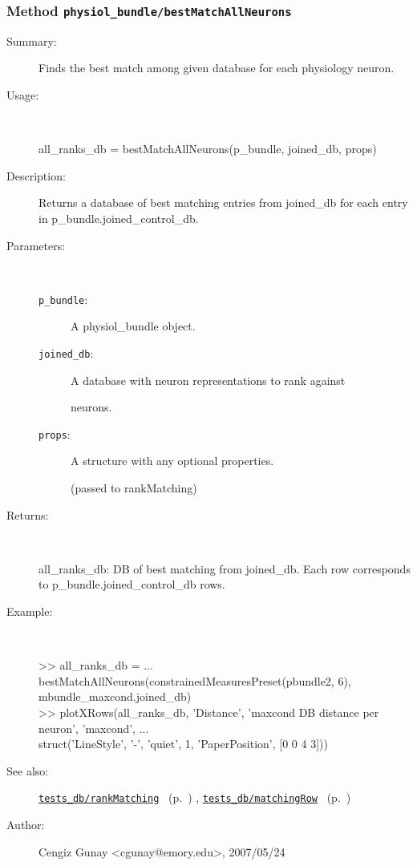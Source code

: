 \subsubsection[Method \texttt{bestMatchAllNeurons}]{Method \texttt{physiol\_bundle/bestMatchAllNeurons}}%
%
\label{ref_physiol_bundle__bestMatchAllNeurons}%
\hypertarget{ref_physiol_bundle__bestMatchAllNeurons}{}%
\begin{description}
\item[Summary:]Finds the best match among given database for each physiology neuron.
%
\item[Usage:]~%
\begin{lyxcode}%
all\_ranks\_db = bestMatchAllNeurons(p\_bundle, joined\_db, props)
%
\end{lyxcode}%
%
\item[Description:]%
Returns a database of best matching entries from joined\_db for each
 entry in p\_bundle.joined\_control\_db.
\item[Parameters:]~
\begin{description}%
\item[\texttt{p\_bundle}:]
 A physiol\_bundle object.
\item[\texttt{joined\_db}:]
 A database with neuron representations to rank against

neurons.
\item[\texttt{props}:]
 A structure with any optional properties.

(passed to rankMatching)
\end{description}%
%
\item[Returns:
]~

	all\_ranks\_db: DB of best matching from joined\_db. Each row
		corresponds to p\_bundle.joined\_control\_db rows.
%
\item[Example:]~
\begin{lyxcode} >> all\_ranks\_db = ...
\\%
        bestMatchAllNeurons(constrainedMeasuresPreset(pbundle2, 6), mbundle\_maxcond.joined\_db)
\\%
 >> plotXRows(all\_ranks\_db, 'Distance', 'maxcond DB distance per neuron', 'maxcond', ...
\\%
              struct('LineStyle', '-', 'quiet', 1, 'PaperPosition', [0 0 4 3]))
\\%
\end{lyxcode}
%
\item[See also:]%
\hyperlink{ref_tests_db__rankMatching}{\texttt{tests\_db/rankMatching}}%
\ (p.~\pageref{ref_tests_db__rankMatching})%
%
, \hyperlink{ref_tests_db__matchingRow}{\texttt{tests\_db/matchingRow}}%
\ (p.~\pageref{ref_tests_db__matchingRow})%
%
%
\item[Author:]%
Cengiz Gunay <cgunay@emory.edu>, 2007/05/24
%
\end{description}
\methodline%
